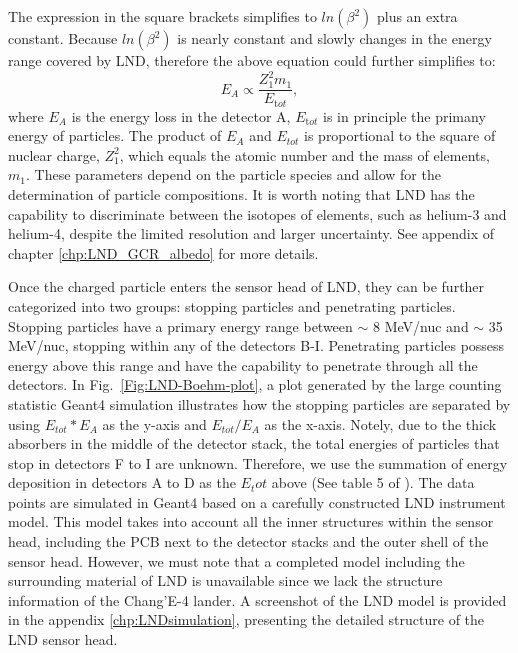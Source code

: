 The expression in the square brackets simplifies to $ln(\beta^2)$ plus an extra constant. Because $ln(\beta^2)$ is nearly constant and slowly changes in the energy range covered by \ac{LND}, therefore the above equation could further simplifies to:
\begin{equation}
    E_A \propto \frac{Z_1^2 m_1}{E_{\mathrm tot}},
    \label{eq:BB2}
\end{equation}
where $E_A$ is the energy loss in the detector A, $E_{\mathrm tot}$ is in principle the primany energy of particles.
The product of $E_A$ and $E_{tot}$ is proportional to the square of nuclear charge, $Z_1^2$, which equals the atomic number and the mass of elements, $m_1$. These parameters depend on the particle species and allow for the determination of particle compositions. It is worth noting that \ac{LND} has the capability to discriminate between the isotopes of elements, such as helium-3 and helium-4, despite the limited resolution and larger uncertainty. See appendix of chapter \ref{chp:LND_GCR_albedo} for more details.



Once the charged particle enters the sensor head of \ac{LND}, they can be further categorized into two groups: stopping particles and penetrating particles. Stopping particles have a primary energy range between $\sim$ 8 MeV/nuc and $\sim$ 35 MeV/nuc, stopping within any of the detectors B-I. Penetrating particles possess energy above this range and have the capability to penetrate through all the detectors. In Fig.~\ref{Fig:LND-Boehm-plot}, a plot generated by the large counting statistic \ac{Geant4} \citep{Agostinelli-2003} simulation illustrates how the stopping particles are separated by using $E_{tot} * E_A$ as the y-axis and $E_{tot} / E_A$ as the x-axis. 
Notely, due to the thick absorbers in the middle of the detector stack, the total energies of particles that stop in detectors F to I are unknown. Therefore, we use the summation of energy deposition in detectors A to D as the $E_tot$ above (See table 5 of \citet{Wimmer2020SSRv}).
The data points are simulated in \ac{Geant4} based on a carefully constructed \ac{LND} instrument model. This model takes into account all the inner structures within the sensor head, including the \ac{PCB} next to the detector stacks and the outer shell of the sensor head. However, we must note that a completed model including the surrounding material of \ac{LND} is unavailable since we lack the structure information of the Chang'E-4 lander.
A screenshot of the \ac{LND} model is provided in the appendix \ref{chp:LNDsimulation}, presenting the detailed structure of the \ac{LND} sensor head.

